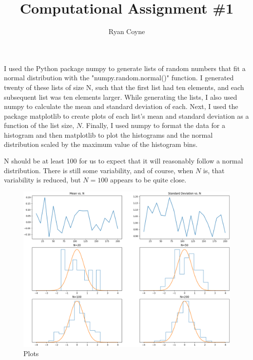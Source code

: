 \documentclass[12pt]{article}
\begin{document}
    \title{Computational Assignment \#1}
    \author{Ryan Coyne}
    \maketitle
    I used the Python package numpy to generate lists of random numbers that fit a normal distribution with the "numpy.random.normal()" function. I generated twenty of these lists of size N, such that the first list had ten elements, and each subsequent list was ten elements larger. While generating the lists, I also used numpy to calculate the mean and standard deviation of each. Next, I used the package matplotlib to create plots of each list's mean and standard deviation as a function of the list size, \(N\). Finally, I used numpy to format the data for a histogram and then matplotlib to plot the histograms and the normal distribution scaled by the maximum value of the histogram bins.

    N should be at least 100 for us to expect that it will reasonably follow a normal distribution. There is still some variability, and of course, when \(N\) is, that variability is reduced, but \(N=100\) appears to be quite close. 
    \begin{figure}[h]
        \centering
        \includegraphics*[width=0.9\linewidth]{"../fig.png"}
        \caption{Plots}
    \end{figure}
\end{document}
